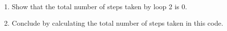 \documentclass[12pt]{article}
\begin{document}
\begin{enumerate}[a.]
\begin{mdframed}
\begin{enumerate}[1.]
            \item Show that the total number of steps taken by loop 2 is 0.
            \item Conclude by calculating the total number of steps taken in this code.
        \end{enumerate}


    \end{mdframed}

\end{enumerate}
\end{document}
